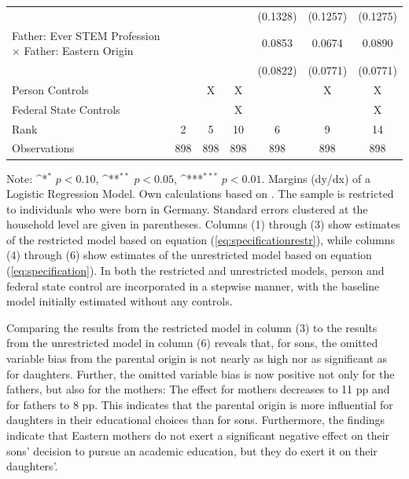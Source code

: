 \documentclass[a4paper, oneside, hyperfootnotes = false]{article}
\def\sym#1{\ifmmode^{#1}\else\(^{#1}\)\fi}
\begin{document}
{\begin{landscape}
\begin{table}[ht]
\begin{center}
{\begin{tabular}{l*{6}{c}}
					&                     &                     &                     &    (0.1328)         &    (0.1257)         &    (0.1275)         \\
					\addlinespace
					Father: Ever STEM Profession $\times$ Father: Eastern Origin&                     &                     &                     &      0.0853         &      0.0674         &      0.0890         \\
					&                     &                     &                     &    (0.0822)         &    (0.0771)         &    (0.0771)         \\
					\midrule
					Person Controls & & X  & X & & X & X \\
					Federal State Controls & & & X & & & X \\
					Rank                &      2         &      5         &     10         &      6         &      9         &     14         \\
					Observations   &    898         &    898         &    898         &    898         &    898         &    898         \\
					\bottomrule
			\end{tabular}}
			
			\vspace{2mm}
			
			\parbox{15cm}{
				\linespread{1}\footnotesize Note: \sym{*} \(p<0.10\), \sym{**} \(p<0.05\), \sym{***} \(p<0.01\). Margins (dy/dx) of a Logistic Regression Model. Own calculations based on \cite{SOEP2023}. The sample is restricted to individuals who were born in Germany. Standard errors clustered at the household level are given in parentheses. Columns (1) through (3) show estimates of the restricted model based on equation (\ref{eq:specificationrestr}), while columns (4) through (6) show estimates of the unrestricted model based on equation (\ref{eq:specification}). In both the restricted and unrestricted models, person and federal state control are incorporated in a stepwise manner, with the baseline model initially estimated without any controls.}
			
		\end{center}
	\end{table}
\end{landscape}

Comparing the results from the restricted model in column (3) to the results from the unrestricted model in column (6) reveals that, for sons, the omitted variable bias from the parental origin is not nearly as high nor as significant as for daughters.
Further, the omitted variable bias is now positive not only for the fathers, but also for the mothers:
The effect for mothers decreases to 11 pp and for fathers to 8 pp.
This indicates that the parental origin is more influential for daughters in their educational choices than for sons.
Furthermore, the findings indicate that Eastern mothers do not exert a significant negative effect on their sons' decision to pursue an academic education, but they do exert it on their daughters'.

}
\end{document}
